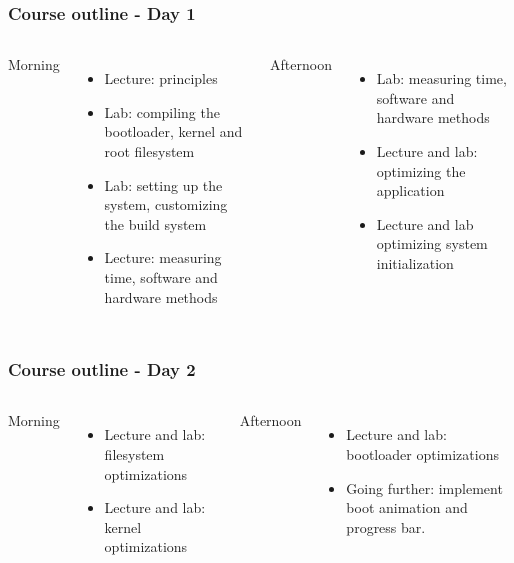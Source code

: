 \begin{frame}
\frametitle{Course outline - Day 1}
\begin{columns}
Morning
  \begin{itemize}
    \item Lecture: principles
    \item Lab: compiling the bootloader, kernel and root filesystem
    \item Lab: setting up the system, customizing the build system
    \item Lecture: measuring time, software and hardware methods
\end{itemize}
  Afternoon
  \begin{itemize}
    \item Lab: measuring time, software and hardware methods
    \item Lecture and lab: optimizing the application
    \item Lecture and lab optimizing system initialization
  \end{itemize}
\end{columns}
\end{frame}

\begin{frame}
\frametitle{Course outline - Day 2}
\begin{columns}
Morning
  \begin{itemize}
    \item Lecture and lab: filesystem optimizations
    \item Lecture and lab: kernel optimizations
\end{itemize}
  Afternoon
  \begin{itemize}
    \item Lecture and lab: bootloader optimizations
    \item Going further: implement boot animation and progress bar.
  \end{itemize}
\end{columns}
\end{frame}

